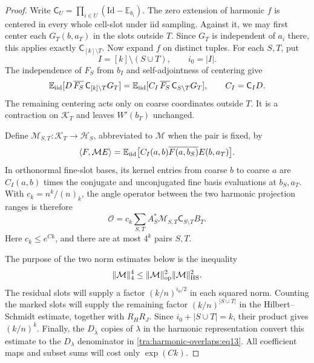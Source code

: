 \begin{proof}
Write \(\mathsf C_U=\prod_{i\in U}(\mathrm{Id}-\mathbb E_{b_i})\). The zero extension of harmonic \(f\) is centered in every whole cell-slot under iid sampling. Against it, we may first center each \(G_T(b,a_T)\) in the slots outside \(T\). Since \(G_T\) is independent of \(a_i\) there, this applies exactly \(\mathsf C_{[k]\setminus T}\). Now expand \(f\) on distinct tuples. For each \(S,T\), put
\[
                   I=[k]\setminus (S\cup T),\qquad i_0=|I|.
\]
The independence of \(F_S\) from \(b_I\) and self-adjointness of centering give
\[
 \mathbb E_{\rm iid}
   [D\,\overline{F_S}\,\mathsf C_{[k]\setminus T}G_T]
 =\mathbb E_{\rm iid}
   [C_I\,\overline{F_S}\,\mathsf C_{S\setminus T}G_T],
 \qquad C_I=\mathsf C_I D.
\]
The remaining centering acts only on coarse coordinates outside \(T\). It is a contraction on \(\mathcal K_T\) and leaves \(W'(b_T)\) unchanged.

Define \(\mathcal M_{S,T}:\mathcal K_T\to\mathcal H_S\), abbreviated to \(\mathcal M\) when the pair is fixed, by
\begin{equation}
 \langle F,\mathcal M E\rangle=
                        \mathbb E_{\rm iid}
                  \big[C_I(a,b)\overline{F(a,b_S)}E(b,a_T)\big].          \label{tra:harmonic-overlaps:eq19}
\end{equation}
In orthonormal fine-slot bases, its kernel entries from coarse \(b\) to coarse \(a\) are \(C_I(a,b)\) times the conjugate and unconjugated fine basis evaluations at \(b_S,a_T\). With \(c_k=n^k/(n)_k\), the angle operator between the two harmonic projection ranges is therefore
\begin{equation}\label{tra:harmonic-overlaps:angle-factorization}
 \mathcal O=c_k\sum_{S,T}
       A_S^*\mathcal M_{S,T}\mathsf C_{S\setminus T}B_T.
\end{equation}
Here \(c_k\le e^{Ck}\), and there are at most \(4^k\) pairs \(S,T\).

The purpose of the two norm estimates below is the inequality
\[
 \|\mathcal M\|_4^4
 \le \|\mathcal M\|_{\rm op}^2\|\mathcal M\|_{\rm HS}^2.
\]
The residual slots will supply a factor $(k/n)^{i_0/2}$ in each squared norm. Counting the marked slots will supply the remaining factor $(k/n)^{|S\cup T|}$ in the Hilbert--Schmidt estimate, together with $R_HR_J$. Since $i_0+|S\cup T|=k$, their product gives $(k/n)^k$. Finally, the $D_{\bar\lambda}$ copies of $\lambda$ in the harmonic representation convert this estimate to the $D_\lambda$ denominator in \eqref{tra:harmonic-overlaps:eq13}. All coefficient maps and subset sums will cost only $\exp(Ck)$.


\end{proof}
